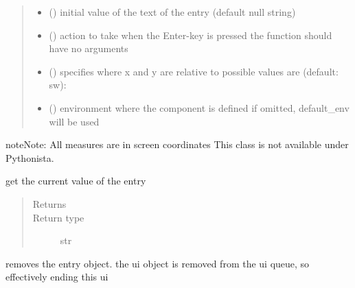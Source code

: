 \documentclass[letterpaper,10pt,english]{sphinxmanual}
\begin{document}
\begin{fulllineitems}
\begin{quote}
\begin{description}
\begin{itemize}
\item {} 
 () \textendash{} initial value of the text of the entry (default null string) 

\item {} 
 () \textendash{} action to take when the Enter-key is pressed 
the function should have no arguments 

\item {} 
 () \textendash{} specifies where x and y are relative to 
possible values are (default: sw): 

\item {} 
 ({\hyperref[\detokenize{Reference:salabim.Environment}]{}}) \textendash{} environment where the component is defined 
if omitted, default\_env will be used

\end{itemize}

\end{description}\end{quote}

\begin{sphinxadmonition}{note}{Note:}
All measures are in screen coordinates 
This class is not available under Pythonista.
\end{sphinxadmonition}

\begin{fulllineitems}
\label{\detokenize{Reference:salabim.AnimateEntry.get}}
get the current value of the entry
\begin{quote}\begin{description}
\item[{Returns}] \leavevmode
{}

\item[{Return type}] \leavevmode
str

\end{description}\end{quote}

\end{fulllineitems}


\begin{fulllineitems}
\label{\detokenize{Reference:salabim.AnimateEntry.remove}}
removes the entry object. 
the ui object is removed from the ui queue,
so effectively ending this ui

\end{fulllineitems}


\end{fulllineitems}
\end{document}
